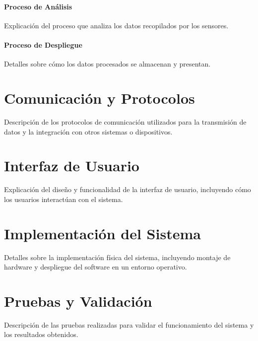 \paragraph{Proceso de Análisis}
Explicación del proceso que analiza los datos recopilados por los sensores.
\paragraph{Proceso de Despliegue}
Detalles sobre cómo los datos procesados se almacenan y presentan.

\section{Comunicación y Protocolos}
Descripción de los protocolos de comunicación utilizados para la transmisión de datos y la integración con otros sistemas o dispositivos.

\section{Interfaz de Usuario}
Explicación del diseño y funcionalidad de la interfaz de usuario, incluyendo cómo los usuarios interactúan con el sistema.

\section{Implementación del Sistema}
Detalles sobre la implementación física del sistema, incluyendo montaje de hardware y despliegue del software en un entorno operativo.

\section{Pruebas y Validación}
Descripción de las pruebas realizadas para validar el funcionamiento del sistema y los resultados obtenidos.
